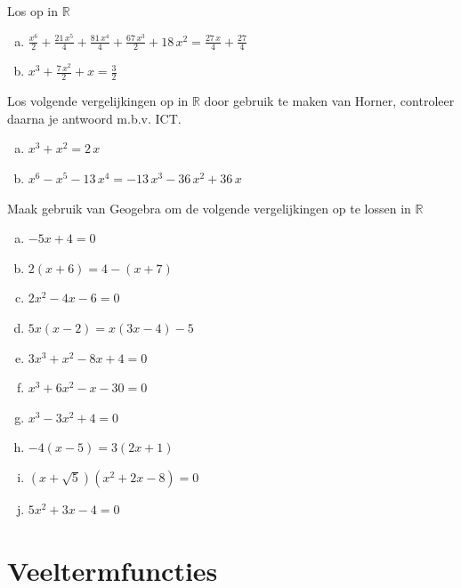\documentclass[12pt]{article}
\begin{document}
\begin{oefening}
  Los op in $\mathbb{R}$\\
  \begin{enumerate}[(a)]
    \itemsep2em
  \item $\displaystyle\frac{{x}^{6}}{2}+\frac{21\,{x}^{5}}{4}+\frac{81\,{x}^{4}}{4}+\frac{67\,{x}^{3}}{2}+18\,{x}^{2}=\frac{27\,x}{4}+\frac{27}{4}$
  \item $\displaystyle{x}^{3}+\frac{7\,{x}^{2}}{2}+x=\frac{3}{2}$
  \end{enumerate}
\end{oefening}

\begin{oefening}
  Los volgende vergelijkingen op in $\mathbb{R}$ door gebruik te maken van Horner, controleer daarna je antwoord m.b.v. ICT.\\
  \begin{enumerate}[(a)]
    \itemsep1em
  \item $\displaystyle{x}^{3}+{x}^{2}=2\,x$
  \item $\displaystyle{x}^{6}-{x}^{5}-13\,{x}^{4}=-13\,{x}^{3}-36\,{x}^{2}+36\,x$
  \end{enumerate}
\end{oefening}

\begin{oefening}
  Maak gebruik van Geogebra om de volgende vergelijkingen op te lossen in $\mathbb{R}$
  \begin{multicols}{2}
    \begin{enumerate}[(a)]
      \itemsep0.7em
    \item $-5x+4=0$
    \item $2(x+6)=4-(x+7)$
    \item $2x^2-4x-6=0$
    \item $5x(x-2)=x(3x-4)-5$
    \item $3x^3+x^2-8x+4=0$
    \item $x^3+6x^2-x-30=0$
    \item $x^3-3x^2+4=0$
    \item $-4(x-5)=3(2x+1)$
    \item $(x+\sqrt{5})(x^2+2x-8)=0$
    \item $5x^2+3x-4=0$
    \end{enumerate}
  \end{multicols}
\end{oefening}


\pagebreak
\section{Veeltermfuncties}
\end{document}
